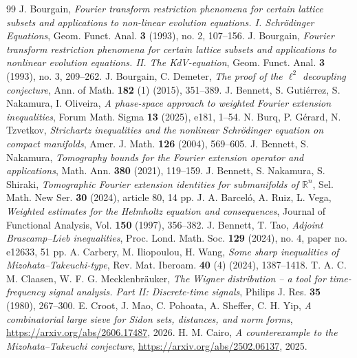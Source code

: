 \documentclass[10pt,a4paper]{amsart}
\numberwithin{equation}{section}
\begin{document}
\begin{thebibliography}{99}
 J. Bourgain, \textit{Fourier transform restriction phenomena for certain lattice subsets and applications to non-linear evolution equations. I. Schr\"{o}dinger Equations}, Geom. Funct. Anal. \textbf{3} (1993), no. 2, 107--156.
 J. Bourgain, \textit{Fourier transform restriction phenomena for certain lattice subsets and applications to nonlinear evolution equations. II. The KdV-equation}, Geom. Funct. Anal. \textbf{3} (1993), no. 3, 209--262. %
 J. Bourgain, C. Demeter, \textit{The proof of the $\ell^2$ decoupling conjecture}, Ann. of Math. \textbf{182} (1) (2015), 351--389.
 J. Bennett, S. Guti\'{e}rrez, S. Nakamura, I. Oliveira, \textit{A phase-space approach to weighted Fourier extension inequalities}, Forum Math. Sigma \textbf{13} (2025), e181, 1--54.
 N. Burq, P. G\'{e}rard, N. Tzvetkov, \textit{Strichartz inequalities and the nonlinear Schr\"{o}dinger equation on compact manifolds}, Amer. J. Math. \textbf{126} (2004), 569--605.
 J. Bennett, S. Nakamura, \textit{Tomography bounds for the Fourier extension operator and applications}, Math. Ann. \textbf{380} (2021), 119--159.
 J. Bennett, S. Nakamura, S. Shiraki, \textit{Tomographic Fourier extension identities for submanifolds of $\mathbb{R}^n$}, Sel. Math. New Ser. \textbf{30} (2024), article 80, 14 pp.
 J. A. Barcel\'{o}, A. Ruiz, L. Vega, \textit{Weighted estimates for the Helmholtz equation and consequences}, Journal of Functional Analysis, Vol. \textbf{150} (1997), 356--382.
 J. Bennett, T. Tao, \textit{Adjoint Brascamp--Lieb inequalities}, Proc. Lond. Math. Soc. \textbf{129} (2024), no. 4, paper no. e12633, 51 pp.
 A. Carbery, M. Iliopoulou, H. Wang, \textit{Some sharp inequalities of Mizohata--Takeuchi-type}, Rev. Mat. Iberoam. \textbf{40} (4) (2024), 1387--1418.
 T. A. C. M. Claasen, W. F. G. Mecklenbr\"auker, \textit{The Wigner distribution -- a tool for time-frequency signal analysis. Part II: Discrete-time signals}, Philips J. Res. \textbf{35} (1980), 267--300.
 E. Croot, J. Mao, C. Pohoata, A. Sheffer, C. H. Yip, \textit{A combinatorial large sieve for Sidon sets, distances, and norm forms}, \url{https://arxiv.org/abs/2606.17487}, 2026.
 H. M. Cairo, \textit{A counterexample to the Mizohata--Takeuchi conjecture}, \url{https://arxiv.org/abs/2502.06137}, 2025.

\end{thebibliography}
\end{document}
